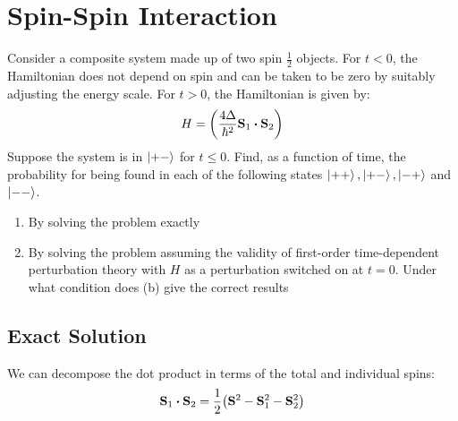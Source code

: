 \documentclass[12pt]{article}
\begin{document}
\section{Spin-Spin Interaction}
\begin{problem}
  Consider a composite system made up of two spin $\frac12$ objects. For $t<0$, the Hamiltonian does not depend on spin and can be taken to be zero by suitably adjusting the energy scale. For $t>0$, the Hamiltonian is given by:
  \begin{align*}
    H=\qty(\frac{4\Delta}{\hbar^2}\vb{S}_1\vdot\vb{S}_2)
  \end{align*}
  Suppose the system is in $\ket{+-}$ for $t\leq0$. Find, as a function of time, the probability for being found in each of the following states $\ket{++},\ket{+-},\ket{-+}$ and $\ket{--}$.
  \begin{enumerate}[label=\alph*]
  \item By solving the problem exactly
  \item By solving the problem assuming the validity of first-order time-dependent perturbation theory with $H$ as a perturbation switched on at $t=0$. Under what condition does (b) give the correct results
  \end{enumerate}
\end{problem}
\subsection{Exact Solution}
We can decompose the dot product in terms of the total and individual spins:
\begin{align*}
  \vb{S}_1\vdot\vb{S}_2=\frac12\qty(\vb{S}^2-\vb{S}_1^2-\vb{S}_2^2)
\end{align*}
\end{document}
